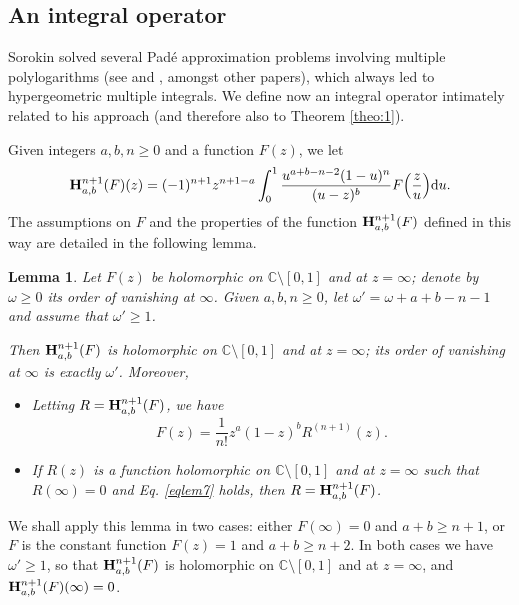 \documentclass[reqno,12pt]{amsart}
\numberwithin{equation}{section}
\newtheorem{lem}{Lemma}
\theoremstyle{remark}
\def\dd{\textup{d}}
\newcommand{\C}{\mathbb{C}}
\newcommand{\BBB}{{\bf H}}
\begin{document}
\subsection{An integral operator} \label{subsec32}

Sorokin solved several Pad\'e approximation problems involving multiple polylogarithms 
(see \cite{sorokin2} and \cite{sorokin1}, amongst other papers), which always led to hypergeometric 
multiple integrals. We define now an integral operator intimately related to his approach (and therefore 
also to Theorem \ref{theo:1}). 

Given integers $a,b,n\geq 0$ and a function $F(z)$, we let 
\begin{equation} \label{eq:12}
\BBB_{a,b}^{n+1}(F)(z) = (-1)^{n+1}z^{n+1-a } \int_0^{1} \frac{u^{a+b-n-2}(1-u)^n}{(u-z)^b}F\Big(\frac zu\Big) \dd u .
\end{equation} 
The assumptions on $F$ and the properties of the function $\BBB_{a,b}^{n+1}(F)$ defined in this 
way are detailed in the following lemma.

\begin{lem} \label{lem:7}
Let $F(z)$ be holomorphic on $\C\setminus[0,1]$ and at $z=\infty$; denote by $\omega\geq 0$ 
its order of vanishing at $\infty$. Given $a,b,n\geq 0$, let $\omega' = \omega + a+b-n-1$ and assume that $\omega' \geq 1$. 

Then $\BBB_{a,b}^{n+1}(F)$ is holomorphic on $\C\setminus[0,1]$ and at $z=\infty$; its  order 
of vanishing at $\infty$ is exactly $\omega'$. Moreover,
\begin{itemize}
\item[$(i)$] Letting $R   = \BBB_{a,b}^{n+1}(F)$, we have
\begin{equation} \label{eqlem7}
F(z)= \frac{1}{n!}z^a(1-z)^b R^{(n+1)}(z) .
\end{equation} 
\item[$(ii)$] If $R(z)$ is a function holomorphic on $\C\setminus[0,1]$ and at $z=\infty$ 
such that $R(\infty)=0$ and Eq. \eqref{eqlem7} holds, then $R= \BBB_{a,b}^{n+1}(F)$.
\end{itemize}
\end{lem}

We shall apply this lemma in two cases: either $F(\infty) = 0$ and $a+b \geq n+1$, or $F$ is 
the constant function $F(z)=1$ and $a+b\geq n+2$. In both cases we have $\omega'\geq 1$, so 
that $ \BBB_{a,b}^{n+1}(F)$ is  holomorphic on $\C\setminus[0,1]$ and at $z=\infty$, and $ \BBB_{a,b}^{n+1}(F)(\infty) = 0$. 
\end{document}
